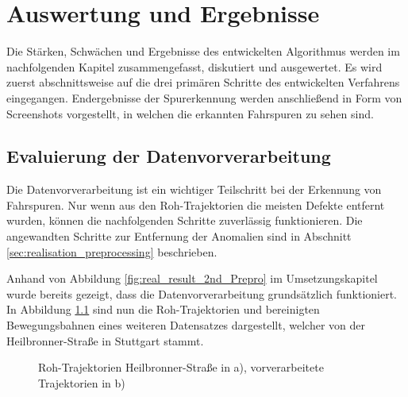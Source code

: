 
\chapter{Auswertung und Ergebnisse}
\label{cha:results}

Die Stärken, Schwächen und Ergebnisse des entwickelten Algorithmus werden im nachfolgenden Kapitel
zusammengefasst, diskutiert und ausgewertet. Es wird zuerst abschnittsweise auf die drei primären Schritte
des entwickelten Verfahrens eingegangen. Endergebnisse der Spurerkennung werden anschließend
in Form von Screenshots vorgestellt, in welchen die erkannten Fahrspuren zu sehen sind.

\section{Evaluierung der Datenvorverarbeitung}
\label{sec:results_eval_dataprocessing}

Die Datenvorverarbeitung ist ein wichtiger Teilschritt bei der Erkennung von Fahrspuren. Nur wenn aus
den Roh-Trajektorien die meisten Defekte entfernt wurden, können die nachfolgenden
Schritte zuverlässig funktionieren. Die angewandten Schritte zur
Entfernung der Anomalien sind in Abschnitt \ref{sec:realisation_preprocessing} beschrieben.

Anhand von Abbildung \ref{fig:real_result_2nd_Prepro} im Umsetzungskapitel wurde bereits gezeigt,
dass die Datenvorverarbeitung grundsätzlich funktioniert.
In Abbildung \ref{fig:results_prePro_heilbronner} sind nun die Roh-Trajektorien und bereinigten Bewegungsbahnen
eines weiteren Datensatzes dargestellt, welcher von der Heilbronner-Straße in Stuttgart stammt.

\begin{figure}[H]
    \centering
    \qquad \qquad
    \caption[Ergebnis Vorverarbeitung Heilbronner-Straße]
            {Roh-Trajektorien Heilbronner-Straße in a), vorverarbeitete Trajektorien in b)}
    \label{fig:results_prePro_heilbronner}
\end{figure}

